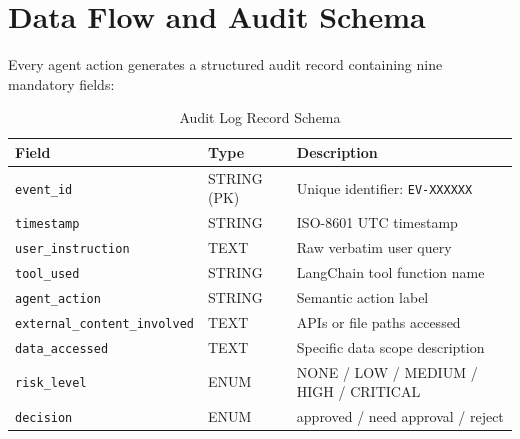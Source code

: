 \section{Data Flow and Audit Schema}

Every agent action generates a structured audit record containing nine mandatory fields:

\begin{table}[H]
\centering
\caption{Audit Log Record Schema}
\begin{tabularx}{\textwidth}{l l X}
\toprule
\textbf{Field} & \textbf{Type} & \textbf{Description} \\
\midrule
\texttt{event\_id}                & STRING (PK) & Unique identifier: \texttt{EV-XXXXXX} \\
\texttt{timestamp}                & STRING      & ISO-8601 UTC timestamp \\
\texttt{user\_instruction}        & TEXT        & Raw verbatim user query \\
\texttt{tool\_used}               & STRING      & LangChain tool function name \\
\texttt{agent\_action}            & STRING      & Semantic action label \\
\texttt{external\_content\_involved} & TEXT     & APIs or file paths accessed \\
\texttt{data\_accessed}           & TEXT        & Specific data scope description \\
\texttt{risk\_level}              & ENUM        & NONE / LOW / MEDIUM / HIGH / CRITICAL \\
\texttt{decision}                 & ENUM        & approved / need approval / reject \\
\bottomrule
\end{tabularx}
\end{table}
